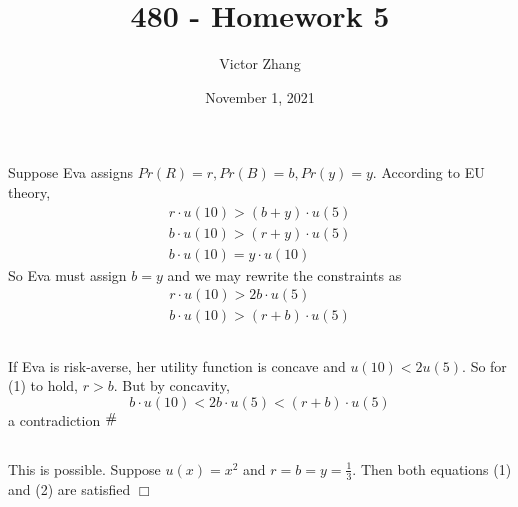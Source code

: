 \documentclass{article}
\title{480 - Homework 5}
\author{Victor Zhang}
\date{November 1, 2021}
\newcommand{\contra}{\raisebox{\depth}{\#}}
\begin{document}
\maketitle

\section{}
Suppose Eva assigns $Pr(R) = r, Pr(B) = b, Pr(y) = y$. According to EU theory,
\begin{gather*}
r \cdot u(10) > (b + y) \cdot u(5)\\
b \cdot u(10) > (r + y) \cdot u(5)\\
b \cdot u(10) = y \cdot u(10)
\end{gather*}
So Eva must assign $b = y$ and we may rewrite the constraints as
\begin{gather}
r \cdot u(10) > 2b \cdot u(5)\\
b \cdot u(10) > (r + b) \cdot u(5)
\end{gather}

\subsection{}
If Eva is risk-averse, her utility function is concave and $u(10) < 2 u(5)$. So for (1) to hold, $r > b$. But by concavity,
$$b \cdot u(10) < 2b \cdot u(5) < (r + b) \cdot u(5)$$
a contradiction $\contra$

\subsection{}
This is possible. Suppose $u(x) = x^2$ and $r = b = y = \frac{1}{3}$. Then both equations (1) and (2) are satisfied $\Box$

\section{}
\end{document}
